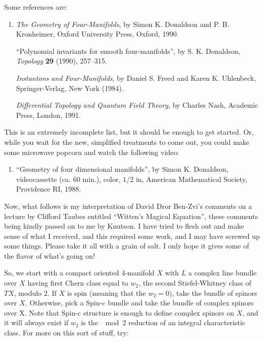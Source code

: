 \documentclass{article}
\def\tightlist{}
\begin{document}
Some references are:

\begin{enumerate}
\def\labelenumi{\arabic{enumi})}
\item
  \emph{The Geometry of Four-Manifolds}, by Simon K. Donaldson and P. B.
  Kronheimer, Oxford University Press, Oxford, 1990.

  ``Polynomial invariants for smooth four-manifolds'', by S. K.
  Donaldson, \emph{Topology} \textbf{29} (1990), 257--315.

  \emph{Instantons and Four-Manifolds}, by Daniel S. Freed and Karen K.
  Uhlenbeck, Springer-Verlag, New York (1984).

  \emph{Differential Topology and Quantum Field Theory}, by Charles
  Nash, Academic Press, London, 1991.
\end{enumerate}

This is an extremely incomplete list, but it should be enough to get
started. Or, while you wait for the new, simplified treatments to come
out, you could make some microwave popcorn and watch the following
video:

\begin{enumerate}
\def\labelenumi{\arabic{enumi})}
\setcounter{enumi}{1}
\tightlist
\item
  ``Geometry of four dimensional manifolds'', by Simon K. Donaldson,
  videocassette (ca. 60 min.), color, \(1/2\) in, American Mathematical
  Society, Providence RI, 1988.
\end{enumerate}

Now, what follows is my interpretation of David Dror Ben-Zvi's comments
on a lecture by Clifford Taubes entitled ``Witten's Magical Equation'',
these comments being kindly passed on to me by Knutson. I have tried to
flesh out and make sense of what I received, and this required some
work, and I may have screwed up some things. Please take it all with a
grain of salt. I only hope it gives some of the flavor of what's going
on!

So, we start with a compact oriented 4-manifold \(X\) with \(L\) a
complex line bundle over \(X\) having first Chern class equal to
\(w_2\), the second Stiefel-Whitney class of \(TX\), modulo \(2\). If
\(X\) is spin (meaning that the \(w_2 = 0\)), take the bundle of spinors
over \(X\). Otherwise, pick a Spin-c bundle and take the bundle of
complex spinors over X. Note that Spin-c structure is enough to define
complex spinors on \(X\), and it will always exist if \(w_2\) is the
\(\mod 2\) reduction of an integral characteristic class. For more on
this sort of stuff, try:
\end{document}
